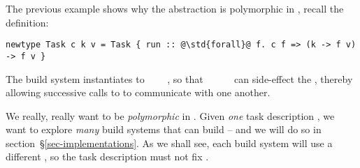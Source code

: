 The previous example shows why the  abstraction is polymorphic in
, recall the definition:

\begin{verbatim}
newtype Task c k v = Task { run :: @\std{forall}@ f. c f => (k -> f v) -> f v }
\end{verbatim}

\noindent
The  build system instantiates  to
~~~~,
so that ~\hs{::}~~\hs{->}~~ can side-effect the
, thereby allowing successive calls to  to communicate with
one another.

We really, really want  to be \emph{polymorphic} in .
Given \emph{one} task description , we want to explore \emph{many} build
systems that can build  -- and we will do so in
section~\S\ref{sec-implementations}. As we shall see, each build system will use
a different , so the task description must not fix .

